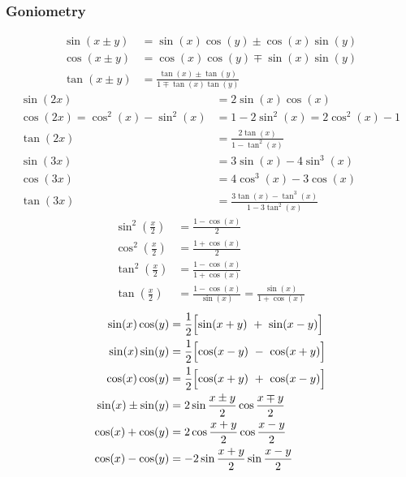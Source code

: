\subsubsection{Goniometry}
\begin{align*}
    \sin(x\pm y) & =\sin(x)\cos(y)\pm\cos(x)\sin(y)              \\
    \cos(x\pm y) & =\cos(x)\cos(y)\mp\sin(x)\sin(y)              \\
    \tan(x\pm y) & =\frac{\tan(x)\pm\tan(y)}{1\mp\tan(x)\tan(y)}
\end{align*}
\begin{align*}
    \sin(2x)                     & =2\sin(x)\cos(x)                         \\
    \cos(2x)=\cos^2(x)-\sin^2(x) & =1-2\sin^2(x)=2\cos^2(x)-1               \\
    \tan(2x)                     & =\frac{2\tan(x)}{1-\tan^2(x)}            \\
    \sin(3x)                     & =3\sin(x)-4\sin^3(x)                     \\
    \cos(3x)                     & =4\cos^3(x)-3\cos(x)                     \\
    \tan(3x)                     & =\frac{3\tan(x)-\tan^3(x)}{1-3\tan^2(x)}
\end{align*}
\begin{align*}
    \sin^2\left(\frac x2\right)    & =\frac{1-\cos(x)}{2}                                 \\
    \cos^2\left(\frac x2\right)    & =\frac{1+\cos(x)}{2}                                 \\
    \tan^2\left(\frac{x}{2}\right) & =\frac{1-\cos(x)}{1+\cos(x)}                         \\
    \tan\left(\frac x2\right)      & =\frac{1-\cos(x)}{\sin(x)}=\frac{\sin(x)}{1+\cos(x)}
\end{align*}
\begin{align*}
    \sin(x)\cos(y)    & =\frac12\Bigl[\sin(x+y)~+~\sin(x-y)\Bigr]   \\
    \sin(x)\sin(y)    & =\frac12\Bigl[\cos(x-y)~-~\cos(x+y)\Bigr]   \\
    \cos(x)\cos(y)    & =\frac12\Bigl[\cos(x+y)~+~\cos(x-y)\Bigr]   \\
    \sin(x)\pm\sin(y) & =2\sin\frac{x\pm y}{2}\cos\frac{x \mp y}{2} \\
    \cos(x)+\cos(y)   & =2\cos\frac{x+y}{2}\cos\frac{x-y}{2}        \\
    \cos(x)-\cos(y)   & =-2\sin\frac{x+y}{2}\sin\frac{x-y}{2}
\end{align*}

